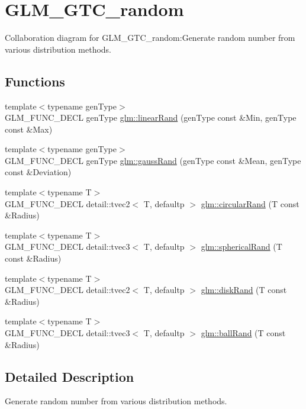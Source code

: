 \hypertarget{group__gtc__random}{
\section{GLM\_\-GTC\_\-random}
\label{group__gtc__random}
}


Collaboration diagram for GLM\_\-GTC\_\-random:Generate random number from various distribution methods.  
\subsection*{Functions}
\begin{CompactItemize}
\item 
{\footnotesize template$<$typename genType$>$ }\\GLM\_\-FUNC\_\-DECL genType \hyperlink{group__gtc__random_gb955b990407d8d4b62cfe2a2a89d9492}{glm::linearRand} (genType const \&Min, genType const \&Max)
\item 
{\footnotesize template$<$typename genType$>$ }\\GLM\_\-FUNC\_\-DECL genType \hyperlink{group__gtc__random_gc045638daf634b0221ef4baaaf643cb2}{glm::gaussRand} (genType const \&Mean, genType const \&Deviation)
\item 
{\footnotesize template$<$typename T$>$ }\\GLM\_\-FUNC\_\-DECL detail::tvec2$<$ T, defaultp $>$ \hyperlink{group__gtc__random_gb633996dfedab1a7f45bb5cfa1b14443}{glm::circularRand} (T const \&Radius)
\item 
{\footnotesize template$<$typename T$>$ }\\GLM\_\-FUNC\_\-DECL detail::tvec3$<$ T, defaultp $>$ \hyperlink{group__gtc__random_g02f5a6b98ae4e494eef340bcdd38ed35}{glm::sphericalRand} (T const \&Radius)
\item 
{\footnotesize template$<$typename T$>$ }\\GLM\_\-FUNC\_\-DECL detail::tvec2$<$ T, defaultp $>$ \hyperlink{group__gtc__random_gea707507f941467133dfdd4f3de9eeed}{glm::diskRand} (T const \&Radius)
\item 
{\footnotesize template$<$typename T$>$ }\\GLM\_\-FUNC\_\-DECL detail::tvec3$<$ T, defaultp $>$ \hyperlink{group__gtc__random_g8543dd05af529c33cb10deb832aab03a}{glm::ballRand} (T const \&Radius)
\end{CompactItemize}


\subsection{Detailed Description}
Generate random number from various distribution methods. 

